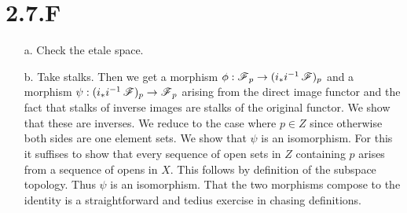 \documentclass{article}
\begin{document}
\section*{2.7.F}
\begin{itemize}
    \item[a.] Check the etale space.
    \item[b.] Take stalks. Then we get a morphism $\phi:\operatorname{\mathscr{F}}_p \to (i_*i^{-1}\operatorname{\mathscr{F}})_p$ and a morphism
        $\psi: (i_*i^{-1}\operatorname{\mathscr{F}})_p \to \operatorname{\mathscr{F}}_p$ arising from the direct image functor and the fact that
        stalks of inverse images are stalks of the original functor. We show that these
        are inverses. We reduce to the case where $p \in Z$ since
        otherwise both sides are one element sets. We show that $\psi$
        is an isomorphism. For this it suffises to show that every sequence of open
        sets in $Z$ containing $p$ arises from a
        sequence of opens in $X$. This follows by definition of the
        subspace topology. Thus $\psi$ is an isomorphism. That the two
        morphisms compose to the identity is a straightforward and tedius exercise in
        chasing definitions.
\end{itemize}
\end{document}
